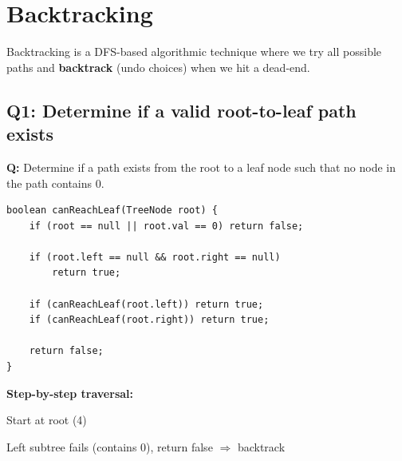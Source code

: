 \section{Backtracking}

Backtracking is a DFS-based algorithmic technique where we try all possible paths
and \textbf{backtrack} (undo choices) when we hit a dead-end.


\subsection{Q1: Determine if a valid root-to-leaf path exists}

\textbf{Q:} Determine if a path exists from the root to a leaf node such that no node in the path contains $0$.

\begin{verbatim}
boolean canReachLeaf(TreeNode root) {
    if (root == null || root.val == 0) return false;

    if (root.left == null && root.right == null)
        return true;

    if (canReachLeaf(root.left)) return true;
    if (canReachLeaf(root.right)) return true;

    return false;
}
\end{verbatim}

\textbf{Step-by-step traversal:}

\begin{center}

{\small Start at root (4)}
\end{center}

\begin{center}

{\small Left subtree fails (contains 0), return false $\Rightarrow$ backtrack}
\end{center}

